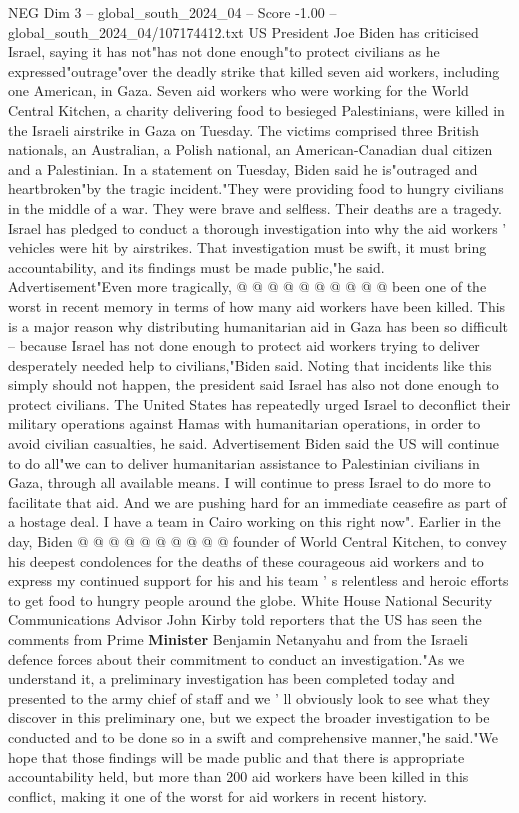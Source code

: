 \begin{textsample}{NEG Dim 3 – global\_south\_2024\_04 – Score -1.00 – global\_south\_2024\_04/107174412.txt}  \label{ex:f3_neg_246}
US President Joe Biden has criticised Israel, saying it has not"has not done enough"to protect civilians as he expressed"outrage"over the deadly strike that killed seven aid workers, including one American, in Gaza.
Seven aid workers who were working for the World Central Kitchen, a charity delivering food to besieged Palestinians, were killed in the Israeli airstrike in Gaza on Tuesday.
The victims comprised three British nationals, an Australian, a Polish national, an American-Canadian dual citizen and a Palestinian.
In a statement on Tuesday, Biden said he is"outraged and heartbroken"by the tragic incident."They were providing food to hungry civilians in the middle of a war.
They were brave and selfless.
Their deaths are a tragedy.
Israel has pledged to conduct a thorough investigation into why the aid workers ' vehicles were hit by airstrikes.
That investigation must be swift, it must bring accountability, and its findings must be made public,"he said.
Advertisement"Even more tragically, @ @ @ @ @ @ @ @ @ @ been one of the worst in recent memory in terms of how many aid workers have been killed.
This is a major reason why distributing humanitarian aid in Gaza has been so difficult -- because Israel has not done enough to protect aid workers trying to deliver desperately needed help to civilians,"Biden said.
Noting that incidents like this simply should not happen, the president said Israel has also not done enough to protect civilians.
The United States has repeatedly urged Israel to deconflict their military operations against Hamas with humanitarian operations, in order to avoid civilian casualties, he said.
Advertisement Biden said the US will continue to do all"we can to deliver humanitarian assistance to Palestinian civilians in Gaza, through all available means.
I will continue to press Israel to do more to facilitate that aid.
And we are pushing hard for an immediate ceasefire as part of a hostage deal.
I have a team in Cairo working on this right now".
Earlier in the day, Biden @ @ @ @ @ @ @ @ @ @ founder of World Central Kitchen, to convey his deepest condolences for the deaths of these courageous aid workers and to express my continued support for his and his team ' s relentless and heroic efforts to get food to hungry people around the globe.
White House National Security Communications Advisor John Kirby told reporters that the US has seen the comments from Prime \textbf{Minister} Benjamin Netanyahu and from the Israeli defence forces about their commitment to conduct an investigation."As we understand it, a preliminary investigation has been completed today and presented to the army chief of staff and we ' ll obviously look to see what they discover in this preliminary one, but we expect the broader investigation to be conducted and to be done so in a swift and comprehensive manner,"he said."We hope that those findings will be made public and that there is appropriate accountability held, but more than 200 aid workers have been killed in this conflict, making it one of the worst for aid workers in recent history.

\end{textsample}
